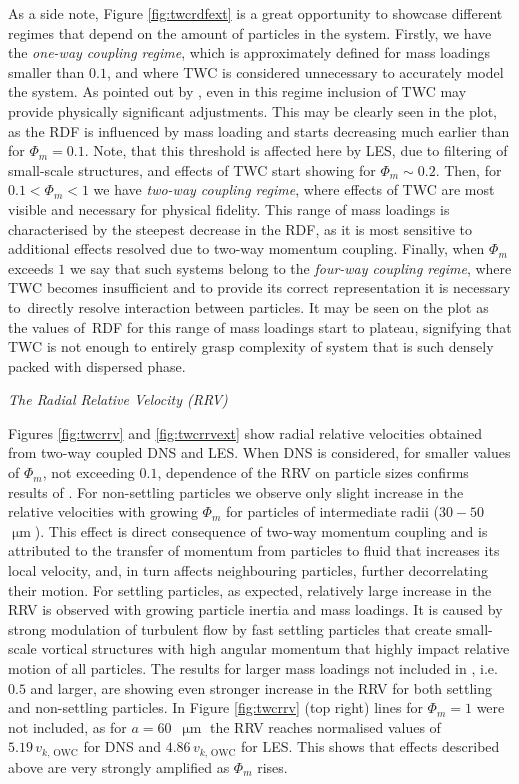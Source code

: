 \documentclass{pracamgren}
\begin{document}
As a side note, Figure \ref{fig:twcrdfext} is a great opportunity to showcase different regimes that depend on the amount of particles in the system.
Firstly, we have the \emph{one-way coupling regime}, which is approximately defined for mass loadings smaller than $0.1$, and where TWC is considered unnecessary to accurately model the system.
As pointed out by \textcite{Rosa2020}, even in this regime inclusion of TWC may provide physically significant adjustments.
This may be clearly seen in the plot, as the RDF is influenced by mass loading and starts decreasing much earlier than for $\Phi_m=0.1$.
Note, that this threshold is affected here by LES, due to filtering of small-scale structures, and effects of TWC start showing for $\Phi_m \sim 0.2$.
Then, for $0.1 < \Phi_m < 1$ we have \emph{two-way coupling regime}, where effects of TWC are most visible and necessary for physical fidelity.
This range of mass loadings is characterised by the steepest decrease in the RDF, as it is most sensitive to additional effects resolved due to two-way momentum coupling.
Finally, when $\Phi_m$ exceeds $1$ we say that such systems belong to the \emph{four-way coupling regime}, where TWC becomes insufficient and to provide its correct representation   it is necessary to~directly resolve interaction between particles.
It may be seen on the plot as the values of~RDF for this range of mass loadings start to plateau, signifying that TWC is not enough to entirely grasp complexity of system that is such densely packed with dispersed phase.

\medskip

\emph{The Radial Relative Velocity (RRV)}

Figures \ref{fig:twcrrv} and \ref{fig:twcrrvext} show radial relative velocities obtained from two-way coupled DNS and LES.
When DNS is considered, for smaller values of $\Phi_m$, not exceeding $0.1$, dependence of the RRV on particle sizes confirms results of \textcite[Fig. 22]{Rosa2020}.
For non-settling particles we observe only slight increase in the relative velocities with growing $\Phi_m$ for particles of intermediate radii ($30-50$~$\upmu\text{m}$).
This effect is direct consequence of two-way momentum coupling and is attributed to the transfer of momentum from particles to fluid that increases its local velocity, and, in turn affects neighbouring particles, further decorrelating their motion.
For settling particles, as expected, relatively large increase in the RRV is observed with growing particle inertia and mass loadings.
It is caused by strong modulation of turbulent flow by fast settling particles that create small-scale vortical structures with high angular momentum that highly impact relative motion of all particles.
The results for larger mass loadings not included in \textcite{Rosa2020}, i.e. $0.5$ and larger, are showing even stronger increase in the RRV for both settling and non-settling particles.
In Figure \ref{fig:twcrrv} (top right) lines for $\Phi_m=1$ were not included, as for $a = 60$~$\upmu\text{m}$ the RRV reaches normalised values of~$5.19 \, v_{k, \, \text{OWC}}$ for DNS and $4.86 \, v_{k, \, \text{OWC}}$ for LES.
This shows that effects described above are very strongly amplified as $\Phi_m$ rises.
\end{document}
